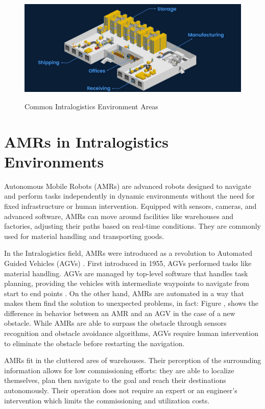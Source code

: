 \begin{figure}[H]
    \begin{center}
        \includegraphics[width=6in]{images/Chap1/common-warehouse-areas.jpg}\\
        \caption{Common Intralogistics Environment Areas \cite{R46}}
        \label{Areas}
        \end{center}
\end{figure}

\section{AMRs in Intralogistics Environments}
Autonomous Mobile Robots (AMRs) are advanced robots designed to navigate and perform tasks independently 
in dynamic environments without the need for fixed infrastructure or human intervention. Equipped with 
sensors, cameras, and advanced software, AMRs can move around facilities like warehouses and 
factories, adjusting their paths based on real-time conditions. They are commonly used 
for material handling and transporting goods.

In the Intralogistics field, AMRs were introduced as a revolution to Automated Guided Vehicles (AGVs) \cite{R7}. 
First introduced in 1955, AGVs performed tasks like 
material handling. AGVs are managed by top-level software that handles task planning, 
providing the vehicles with intermediate waypoints to navigate from start to end points \cite{R7}.
On the other hand, AMRs are automated in a way that makes them find the solution to unexpected problems, 
in fact:
Figure , shows the difference in behavior between an AMR and an AGV in the case of a 
new obstacle. While AMRs are able to surpass the obstacle through sensors recognition and obstacle 
avoidance algorithms, AGVs require human intervention to eliminate the obstacle before restarting the navigation.

AMRs fit in the cluttered ares of warehouses. Their perception of the surrounding information allows for
low commissioning efforts: they are able to localize themselves, plan then navigate to the goal and reach their 
destinations autonomously. Their operation does not require an expert or an engineer's intervention which 
limits the commissioning and utilization costs.

